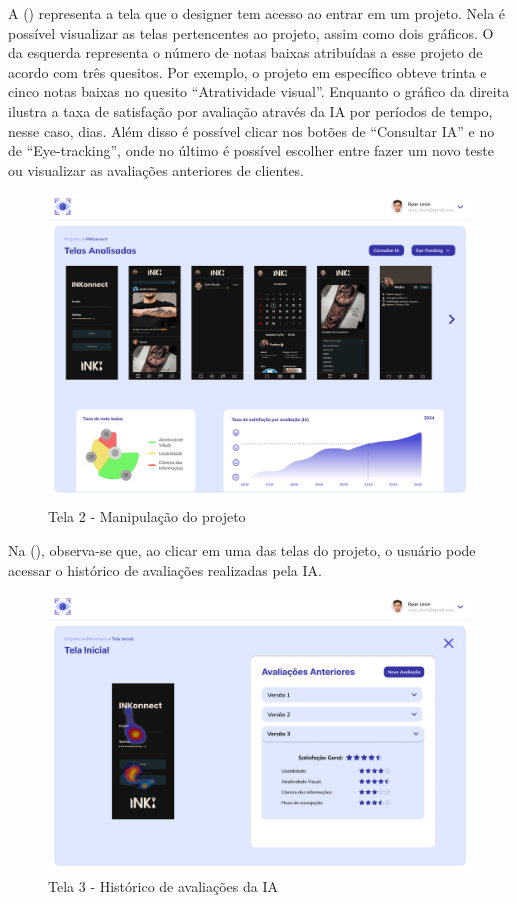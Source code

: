 A () representa a tela que o designer tem acesso ao entrar em um projeto. Nela é possível visualizar as telas pertencentes ao projeto, assim como dois gráficos. O da esquerda representa o número de notas baixas atribuídas a esse projeto de acordo com três quesitos. Por exemplo, o projeto em específico obteve trinta e cinco notas baixas no quesito “Atratividade visual”. Enquanto o gráfico da direita ilustra a taxa de satisfação por avaliação através da IA por períodos de tempo, nesse caso, dias. Além disso é possível clicar nos botões de “Consultar IA” e no de “Eye-tracking”, onde no último é possível escolher entre fazer um novo teste ou visualizar as avaliações anteriores de clientes.

\begin{figure}[H]
    \centering
    \caption{Tela 2 - Manipulação do projeto}%
    \label{fig:pg-tela2}
    \includegraphics[width=0.72\linewidth]{Illustrations/tela2.png}
\end{figure}

Na (), observa-se que, ao clicar em uma das telas do projeto, o usuário pode acessar o histórico de avaliações realizadas pela IA.

\begin{figure}[H]
    \centering
    \caption{Tela 3 - Histórico de avaliações da IA}%
    \label{fig:pg-tela3}
    \includegraphics[width=0.72\linewidth]{Illustrations/tela3.png}
\end{figure}


